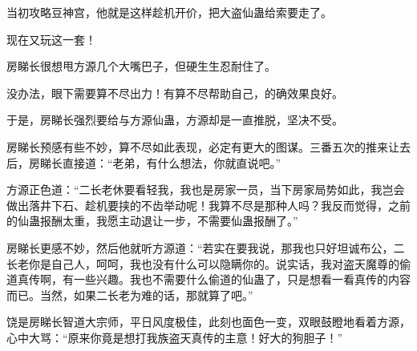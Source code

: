 \begin{this_body}
当初攻略豆神宫，他就是这样趁机开价，把大盗仙蛊给索要走了。

现在又玩这一套！

房睇长很想甩方源几个大嘴巴子，但硬生生忍耐住了。

没办法，眼下需要算不尽出力！有算不尽帮助自己，的确效果良好。

于是，房睇长强烈要给与方源仙蛊，方源却是一直推脱，坚决不受。

房睇长预感有些不妙，算不尽如此表现，必定有更大的图谋。三番五次的推来让去后，房睇长直接道：“老弟，有什么想法，你就直说吧。”

方源正色道：“二长老休要看轻我，我也是房家一员，当下房家局势如此，我岂会做出落井下石、趁机要挟的不齿举动呢！我算不尽是那种人吗？我反而觉得，之前的仙蛊报酬太重，我愿主动退让一步，不需要仙蛊报酬了。”

房睇长更感不妙，然后他就听方源道：“若实在要我说，那我也只好坦诚布公，二长老你是自己人，呵呵，我也没有什么可以隐瞒你的。说实话，我对盗天魔尊的偷道真传啊，有一些兴趣。我也不需要什么偷道的仙蛊了，只是想看一看真传的内容而已。当然，如果二长老为难的话，那就算了吧。”

饶是房睇长智道大宗师，平日风度极佳，此刻也面色一变，双眼鼓瞪地看着方源，心中大骂：“原来你竟是想打我族盗天真传的主意！好大的狗胆子！”

\end{this_body}


